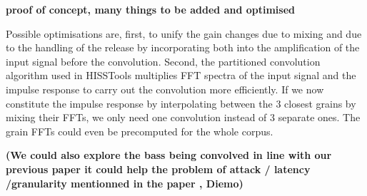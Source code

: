 \textbf{proof of concept, many things to be added and optimised}

Possible optimisations are, first, to unify the gain changes due to mixing and due to the handling of the release by incorporating both into the amplification of the input signal before the convolution.
Second, the partitioned convolution algorithm used in HISSTools multiplies FFT spectra of the input signal and the impulse response to carry out the convolution more efficiently.  If we now constitute the impulse response by interpolating between the 3 closest grains by mixing their FFTs, we only need one convolution instead of 3 separate ones.  The grain FFTs could even be precomputed for the whole corpus. %


\textbf{(We could also explore the bass being convolved in line with our previous paper it could help the problem of attack / latency /granularity mentionned in the paper \cite{TremblaySchwarz-nime2010-surfing-the-waves}, Diemo)}
